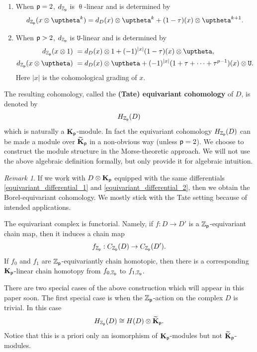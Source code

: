 \documentclass[reqno, 10pt]{amsart}
\numberwithin{equation}{section}
\numberwithin{equation}{section}
\theoremstyle{definition}
\theoremstyle{remark}
\newtheorem{rem}[thm]{Remark}
\newcommand{\beq}{\begin{equation}}
\newcommand{\eeq}{\end{equation}}
\newcommand{\beqn}{\begin{equation*}}
\newcommand{\eeqn}{\end{equation*}}
\newcommand{\mb}{\mathbb}
\newcommand{\p}{{\sf p}}
\newcommand{\kp}{{\bf K}_{\sf p}}
\newcommand{\tkp}{\wt{\bf K}_{\sf p}}
\newcommand{\zp}{{{\mb Z}_{\sf p}}}
\newcommand{\tu}{\mathtt{U}}
\newcommand{\wt}{\widetilde}
\begin{document}
\begin{enumerate}

\item When $\p = 2$, $d_{\zp}$ is $\uptheta$-linear and is determined by 
\beq\label{equivariant_differential_1}
d_{\zp}(x\otimes \uptheta^k) = d_D(x) \otimes \uptheta^k + ( 1 - \tau) (x) \otimes \uptheta^{k+1}.
\eeq

\item When $\p > 2$, $d_{\zp}$ is $\tu$-linear and is determined by 
\beq\label{equivariant_differential_2}
\begin{split}
d_\zp (x\otimes 1) &\ = d_D(x) \otimes 1 + (-1)^{|x|} (1-\tau)(x) \otimes \uptheta,\\
d_\zp (x \otimes \uptheta) &\ = d_D(x) \otimes \uptheta + (-1)^{|x|} ( 1+ \tau + \cdots + \tau^{p-1})(x) \otimes \tu.
\end{split}
\eeq
Here $|x|$ is the cohomological grading of $x$.
\end{enumerate}
The resulting cohomology, called the {\bf (Tate) equivariant cohomology} of $D$, is denoted by 
\beqn
H_{\zp} (D)
\eeqn
which is naturally a $\kp$-module. 
In fact the equivariant cohomology $H_{\zp} (D)$ can be made a module over $\tkp$ in a non-obvious way (unless $\p = 2$). We choose to construct the module structure in the Morse-theoretic approach. We will not use the above algebraic definition formally, but only provide it for algebraic intuition.

\begin{rem}
    If we work with $D \otimes \kp$ equipped with the same differentials \eqref{equivariant_differential_1} and \eqref{equivariant_differential_2}, then we obtain the Borel-equivariant cohomology. We mostly stick with the Tate setting because of intended applications.
\end{rem}

The equivariant complex is functorial. Namely, if $f: D \to D'$ is a $\zp$-equivariant chain map, then it induces a chain map
\beqn
f_{\zp}: C_{\zp}(D) \to C_{\zp}(D').
\eeqn
If $f_0$ and $f_1$ are $\zp$-equivariantly chain homotopic, then there is a corresponding $\kp$-linear chain homotopy from $f_{0, \zp}$ to $f_{1, \zp}$. 


There are two special cases of the above construction which will appear in this paper soon. The first special case is when the $\zp$-action on the complex $D$ is trivial. In this case
\beqn
H_{\zp} (D) \cong H (D) \otimes \tkp.
\eeqn
Notice that this is a priori only an isomorphism of $\kp$-modules but not $\tkp$-modules.
\end{document}
